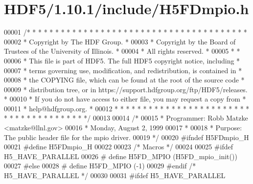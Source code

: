 \hypertarget{_h_d_f5_21_810_81_2include_2_h5_f_dmpio_8h_source}{}\section{H\+D\+F5/1.10.1/include/\+H5\+F\+Dmpio.h}
\label{_h_d_f5_21_810_81_2include_2_h5_f_dmpio_8h_source}

\begin{DoxyCode}
00001 \textcolor{comment}{/* * * * * * * * * * * * * * * * * * * * * * * * * * * * * * * * * * * * * * *}
00002 \textcolor{comment}{ * Copyright by The HDF Group.                                               *}
00003 \textcolor{comment}{ * Copyright by the Board of Trustees of the University of Illinois.         *}
00004 \textcolor{comment}{ * All rights reserved.                                                      *}
00005 \textcolor{comment}{ *                                                                           *}
00006 \textcolor{comment}{ * This file is part of HDF5.  The full HDF5 copyright notice, including     *}
00007 \textcolor{comment}{ * terms governing use, modification, and redistribution, is contained in    *}
00008 \textcolor{comment}{ * the COPYING file, which can be found at the root of the source code       *}
00009 \textcolor{comment}{ * distribution tree, or in https://support.hdfgroup.org/ftp/HDF5/releases.  *}
00010 \textcolor{comment}{ * If you do not have access to either file, you may request a copy from     *}
00011 \textcolor{comment}{ * help@hdfgroup.org.                                                        *}
00012 \textcolor{comment}{ * * * * * * * * * * * * * * * * * * * * * * * * * * * * * * * * * * * * * * */}
00013 
00014 \textcolor{comment}{/*}
00015 \textcolor{comment}{ * Programmer:  Robb Matzke <matzke@llnl.gov>}
00016 \textcolor{comment}{ *              Monday, August  2, 1999}
00017 \textcolor{comment}{ *}
00018 \textcolor{comment}{ * Purpose: The public header file for the mpio driver.}
00019 \textcolor{comment}{ */}
00020 \textcolor{preprocessor}{#ifndef H5FDmpio\_H}
00021 \textcolor{preprocessor}{#define H5FDmpio\_H}
00022 
00023 \textcolor{comment}{/* Macros */}
00024 
00025 \textcolor{preprocessor}{#ifdef H5\_HAVE\_PARALLEL}
00026 \textcolor{preprocessor}{#   define H5FD\_MPIO    (H5FD\_mpio\_init())}
00027 \textcolor{preprocessor}{#else}
00028 \textcolor{preprocessor}{#   define H5FD\_MPIO    (-1)}
00029 \textcolor{preprocessor}{#endif }\textcolor{comment}{/* H5\_HAVE\_PARALLEL */}\textcolor{preprocessor}{}
00030 
00031 \textcolor{preprocessor}{#ifdef H5\_HAVE\_PARALLEL}

\end{DoxyCode}
